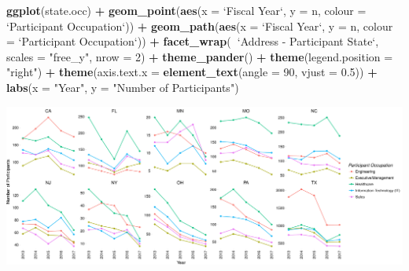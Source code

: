\documentclass[]{article}
\newenvironment{Shaded}{\begin{snugshade}}{\end{snugshade}}
\newcommand{\KeywordTok}[1]{\textcolor[rgb]{0.13,0.29,0.53}{\textbf{#1}}}
\newcommand{\DataTypeTok}[1]{\textcolor[rgb]{0.13,0.29,0.53}{#1}}
\newcommand{\DecValTok}[1]{\textcolor[rgb]{0.00,0.00,0.81}{#1}}
\newcommand{\FloatTok}[1]{\textcolor[rgb]{0.00,0.00,0.81}{#1}}
\newcommand{\StringTok}[1]{\textcolor[rgb]{0.31,0.60,0.02}{#1}}
\newcommand{\OperatorTok}[1]{\textcolor[rgb]{0.81,0.36,0.00}{\textbf{#1}}}
\newcommand{\NormalTok}[1]{#1}
\begin{document}
\begin{Shaded}
\begin{Highlighting}[]
\KeywordTok{ggplot}\NormalTok{(state.occ) }\OperatorTok{+}\StringTok{ }
\KeywordTok{geom_point}\NormalTok{(}\KeywordTok{aes}\NormalTok{(}\DataTypeTok{x =} \StringTok{`}\DataTypeTok{Fiscal Year}\StringTok{`}\NormalTok{, }\DataTypeTok{y =}\NormalTok{ n, }\DataTypeTok{colour =} \StringTok{`}\DataTypeTok{Participant Occupation}\StringTok{`}\NormalTok{)) }\OperatorTok{+}\StringTok{ }
\StringTok{    }\KeywordTok{geom_path}\NormalTok{(}\KeywordTok{aes}\NormalTok{(}\DataTypeTok{x =} \StringTok{`}\DataTypeTok{Fiscal Year}\StringTok{`}\NormalTok{, }\DataTypeTok{y =}\NormalTok{ n, }\DataTypeTok{colour =} \StringTok{`}\DataTypeTok{Participant Occupation}\StringTok{`}\NormalTok{)) }\OperatorTok{+}\StringTok{ }
\StringTok{    }\KeywordTok{facet_wrap}\NormalTok{(}\OperatorTok{~}\StringTok{`}\DataTypeTok{Address - Participant State}\StringTok{`}\NormalTok{, }\DataTypeTok{scales =} \StringTok{"free_y"}\NormalTok{, }
        \DataTypeTok{nrow =} \DecValTok{2}\NormalTok{) }\OperatorTok{+}\StringTok{ }
\KeywordTok{theme_pander}\NormalTok{() }\OperatorTok{+}\StringTok{ }\KeywordTok{theme}\NormalTok{(}\DataTypeTok{legend.position =} \StringTok{"right"}\NormalTok{) }\OperatorTok{+}\StringTok{ }\KeywordTok{theme}\NormalTok{(}\DataTypeTok{axis.text.x =} \KeywordTok{element_text}\NormalTok{(}\DataTypeTok{angle =} \DecValTok{90}\NormalTok{, }
    \DataTypeTok{vjust =} \FloatTok{0.5}\NormalTok{)) }\OperatorTok{+}\StringTok{ }\KeywordTok{labs}\NormalTok{(}\DataTypeTok{x =} \StringTok{"Year"}\NormalTok{, }\DataTypeTok{y =} \StringTok{"Number of Participants"}\NormalTok{)}
\end{Highlighting}
\end{Shaded}

\includegraphics{index_files/figure-latex/facet.participants-1.pdf}
\end{document}
